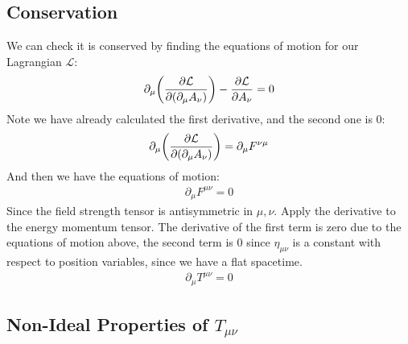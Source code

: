 \documentclass[12pt]{article}
\renewcommand{\L}{\mathcal{L}}
\newcommand{\D}{\partial}
\begin{document}
\subsection{Conservation}
We can check it is conserved by finding the equations of motion for our Lagrangian $\L$:
\begin{align*}
  \D_\mu\qty(\pdv{\L}{(\D_\mu A_\nu)})-\pdv{\L}{A_\nu}=0
\end{align*}
Note we have already calculated the first derivative, and the second one is $0$:
\begin{align*}
  \D_\mu\qty(\pdv{\L}{(\D_\mu A_\nu)})=\D_\mu F^{\nu\mu}
\end{align*}
And then we have the equations of motion:
\begin{align*}
  \D_\mu F^{\mu\nu}=0
\end{align*}
Since the field strength tensor is antisymmetric in $\mu,\nu$. Apply the derivative to the energy momentum tensor. The derivative of the first term is zero due to the equations of motion above, the second term is $0$ since $\eta_{\mu\nu}$ is a constant with respect to position variables, since we have a flat spacetime. 
\begin{align}
  \boxed{\D_\mu T^{\mu\nu}=0}
\end{align}

\subsection{Non-Ideal Properties of $T_{\mu\nu}$}
\end{document}
